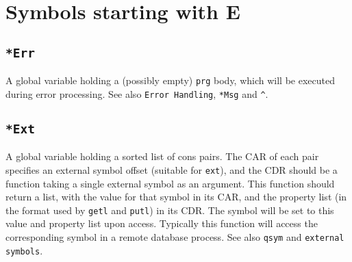 %
%
%



\chapter{Symbols starting with E}
\label{cha:func-ref-E-functions-starting-with-E}

 
\section*{\texttt{*Err}}
\label{sec:func-ref-E-*Err}


A global variable holding a (possibly empty) \texttt{prg} body, which will be
executed during error processing. See also \texttt{Error Handling}, \texttt{*Msg} and
\texttt{\textasciicircum{}}.



 
\section*{\texttt{*Ext}}
\label{sec:func-ref-E-*Ext}


A global variable holding a sorted list of cons pairs. The CAR of each
pair specifies an external symbol offset (suitable for \texttt{ext}), and the
CDR should be a function taking a single external symbol as an argument.
This function should return a list, with the value for that symbol in
its CAR, and the property list (in the format used by \texttt{getl} and \texttt{putl})
in its CDR. The symbol will be set to this value and property list upon
access. Typically this function will access the corresponding symbol in
a remote database process. See also \texttt{qsym} and \texttt{external symbols}.


